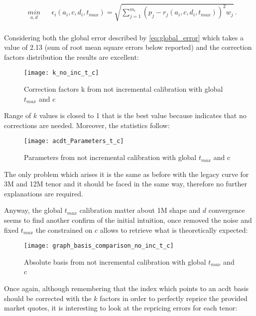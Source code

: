 \begin{equation*}
\begin{aligned}
& \underset{a,d}{min}
& & \epsilon_{i}(a_{i},c,d_{i},t_{max})=\sqrt{\sum_{j=1}^{m_{i}}(p_{j}-r_{j}(a_{i},c,d_{i},t_{max}))^{2}w_{j}}\,. \\
\end{aligned}
\end{equation*} 

Considering both the global error described by \eqref{eq:global_error} which takes a value of 2.13 (sum of root mean square errors below reported) and the correction factors distribution the results are excellent:

\begin{figure}[H]
\centering
\texttt{[image: k\_no\_inc\_t\_c]}
\caption{Correction factors k from not incremental calibration with global $t_{max}$ and c}
\label{fig:k_no_inc_t_c}
\end{figure}

Range of $k$ values is closed to 1 that is the best value because indicates that no corrections are needed.
Moreover, the statistics follow:

\begin{figure}[H]
\centering
\texttt{[image: acdt\_Parameters\_t\_c]}
\caption{Parameters from not incremental calibration with global $t_{max}$ and c}
\label{fig:acdt_Parameters_t_c}
\end{figure}

The only problem which arises it is the same as before with the legacy curve for 3M and 12M tenor and it should be faced in the same way, therefore no further explanations are required.

Anyway, the global $t_{max}$ calibration matter about 1M shape and $d$ convergence seems to find another confirm of the initial intuition, once removed the noise and fixed $t_{max}$ the constrained on $c$ allows to retrieve what is theoretically expected:

\begin{figure}[H]
\centering
\texttt{[image: graph\_basis\_comparison\_no\_inc\_t\_c]}
\caption{Absolute basis from not incremental calibration with global $t_{max}$ and c}
\label{fig:graph_basis_comparison_no_inc_t_c}
\end{figure}

Once again, although remembering that the index which points to an acdt basis should be corrected with the $k$ factors in order to perfectly reprice the provided market quotes, it is interesting to look at the repricing errors for each tenor:

